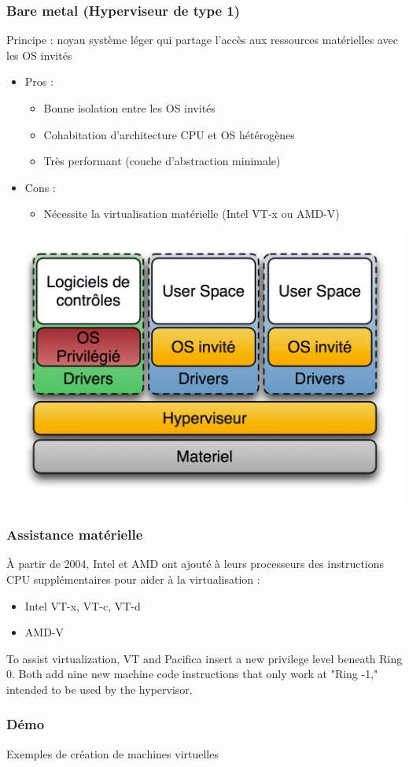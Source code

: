   \begin{frame}
    \frametitle{Bare metal (Hyperviseur de type 1)}
    Principe : noyau système léger qui partage l’accès aux ressources matérielles avec les OS invités
    \begin{itemize}
      \item Pros :
      \begin{itemize}
        \item Bonne isolation entre les OS invités
        \item Cohabitation d'architecture CPU et OS hétérogènes
        \item Très performant (couche d'abstraction minimale)
      \end{itemize}
      \item Cons :
      \begin{itemize}
        \item Nécessite la virtualisation matérielle (Intel VT-x ou AMD-V)
      \end{itemize}
    \end{itemize}
    \begin{center}
      \includegraphics[width=0.5\linewidth]{images/Diagramme_ArchiHyperviseur.png}
    \end{center}
  \end{frame}
  
  \begin{frame}
    \frametitle{Assistance matérielle}
    À partir de 2004, Intel et AMD ont ajouté à leurs processeurs des instructions CPU supplémentaires pour aider à la virtualisation :
    \begin{itemize}
      \item Intel VT-x, VT-c, VT-d
      \item AMD-V
    \end{itemize}
    
    \og To assist virtualization, VT and Pacifica insert a new privilege level beneath Ring 0. Both add nine new machine code instructions that only work at "Ring -1," intended to be used by the hypervisor. \fg{}
  \end{frame}
  
  \begin{frame}
    \frametitle{Démo}
    \huge{Exemples de création de machines virtuelles}
  \end{frame}
